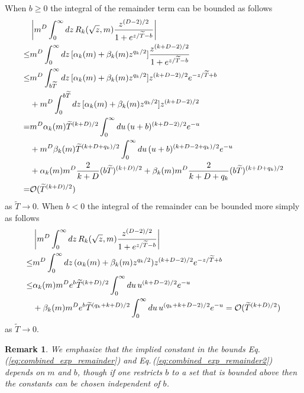 \documentclass[sn-mathphys,Numbered]{sn-jnl}
\newcommand{\req}[1]{Eq.\,(\ref{#1})}
\newtheorem{remark}{Remark}
\begin{document}
When $b\geq 0$ the integral of the remainder term can be bounded as follows
\begin{align}
 &\left|m^{D}\int_0^\infty dz\, R_k(\sqrt{z},m)\frac{z^{(D-2)/2}}{1+e^{z/\widetilde{T}-b}}\right|\\
 \leq&m^{D}\int_0^\infty dz\, [\alpha_k(m)+\beta_k(m)z^{q_k/2}]\frac{z^{(k+D-2)/2}}{1+e^{z/\widetilde{T}-b}}\notag\\
 \leq &m^{D}\int_{b\widetilde{T}}^\infty dz\, [\alpha_k(m)+\beta_k(m)z^{q_k/2}]z^{(k+D-2)/2}e^{-z/\widetilde{T}+b}\notag\\
 &+m^{D}\int_0^{{b\widetilde{T}}} dz\, [\alpha_k(m)+\beta_k(m)z^{q_k/2}]z^{(k+D-2)/2}\notag\\
 =&m^{D} \alpha_k(m)\widetilde{T}^{(k+D)/2}\int_{0}^\infty du\,(u+b)^{(k+D-2)/2}e^{-u}\notag\\
 &+m^D\beta_k(m)\widetilde{T}^{(k+D+q_k)/2}\int_{0}^\infty du\,(u+b)^{(k+D-2+q_k)/2}e^{-u}\notag\\
 &+\alpha_k(m)m^{D}\frac{2}{k+D}(b\widetilde{T})^{(k+D)/2}+\beta_k(m)m^{D}\frac{2}{k+D+q_k}(b\widetilde{T})^{(k+D+q_k)/2}\notag\\
 =&\mathcal{O}(\widetilde{T}^{(k+D)/2})\label{eq:combined_exp_remainder}
\end{align}
as $\widetilde{T}\to 0$. When $b<0$ the integral of the remainder can be bounded more simply as follows
\begin{align}
 &\left|m^{D}\int_0^\infty dz\, R_k(\sqrt{z},m)\frac{z^{(D-2)/2}}{1+e^{z/\widetilde{T}-b}}\right|\\
 \leq&m^{D}\int_0^\infty dz\, (\alpha_k(m)+\beta_k(m)z^{q_k/2}) 
z^{(k+D-2)/2}e^{-z/\widetilde{T}+b}\notag\\
 \leq&\alpha_k(m)m^{D}e^b\widetilde{T}^{(k+D)/2}\int_0^\infty du\, u^{(k+D-2)/2}e^{-u}\notag\\
 &+\beta_k(m)m^{D}e^b\widetilde{T}^{(q_k+k+D)/2}\int_0^\infty du\,u^{(q_k+k+D-2)/2}e^{-u} 
=\mathcal{O}(\widetilde{T}^{(k+D)/2}) \label{eq:combined_exp_remainder2}
\end{align}
as $\widetilde{T}\to 0$.
\begin{remark}\label{remark:combined_remainder_uniform_in_b}
We emphasize that the implied constant in the bounds \req{eq:combined_exp_remainder} and \req{eq:combined_exp_remainder2} depends on $m$ and $b$, though if one restricts $b$ to a set that is bounded above then the constants can be chosen independent of $b$. 
\end{remark}
\end{document}
